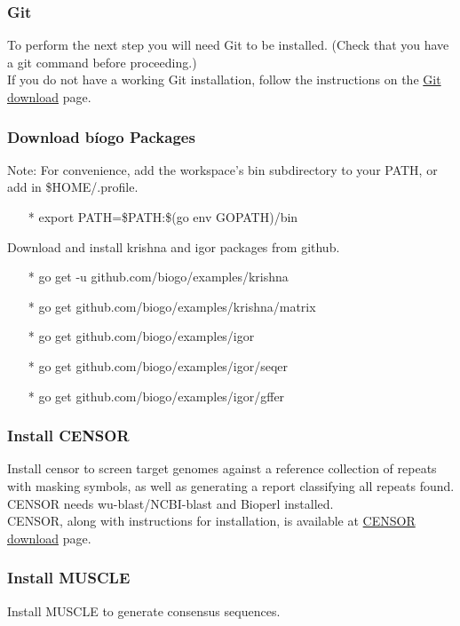 \documentclass[12pt]{article}
\begin{document}
\subsubsection{Git}
To perform the next step you will need Git to be installed. (Check that you have a git command before proceeding.) \\

\noindent If you do not have a working Git installation, follow the instructions on the \href{https://git-scm.com/downloads}{\color{blue}Git download} page.

\subsubsection{Download b\'iogo Packages}
{\color{red} Note:}  For convenience, add the workspace's bin subdirectory to your PATH, or add in \$HOME/.profile. 
\begin{enumerate}
	\item[*] export PATH=\$PATH:\$(go env GOPATH)/bin
\end{enumerate}

\noindent Download and install krishna and igor packages from github. 

\begin{enumerate}
	\item[*] go get -u github.com/biogo/examples/krishna
	\item[*] go get github.com/biogo/examples/krishna/matrix
	\item[*] go get github.com/biogo/examples/igor
	\item[*] go get github.com/biogo/examples/igor/seqer
	\item[*] go get github.com/biogo/examples/igor/gffer
\end{enumerate}

\subsubsection{ Install CENSOR}
Install censor to screen target genomes against a reference collection of repeats with masking symbols, as well as generating a report classifying all repeats found. CENSOR needs wu-blast/NCBI-blast and Bioperl installed.\\

\noindent CENSOR, along with instructions for installation, is available at \href{http://www.girinst.org/downloads/software/censor/} {\color{blue}CENSOR download} page.

\subsubsection{ Install MUSCLE}
Install MUSCLE to generate consensus sequences.
\end{document}
